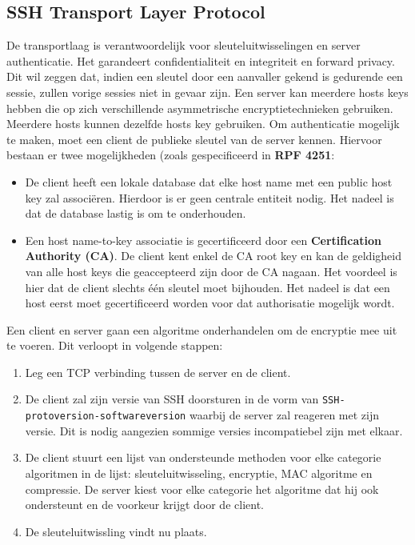 \documentclass{report}
\begin{document}
	\subsection{SSH Transport Layer Protocol}
	De transportlaag is verantwoordelijk voor sleuteluitwisselingen en server authenticatie. Het garandeert confidentialiteit en integriteit en forward privacy. Dit wil zeggen dat, indien een sleutel door een aanvaller gekend is gedurende een sessie, zullen vorige sessies niet in gevaar zijn. Een server kan meerdere hosts keys hebben die op zich verschillende asymmetrische encryptietechnieken gebruiken. Meerdere hosts kunnen dezelfde hosts key gebruiken. Om authenticatie mogelijk te maken, moet een client de publieke sleutel van de server kennen. Hiervoor bestaan er twee mogelijkheden (zoals gespecificeerd in \textbf{RPF 4251}:
	\begin{itemize}
		\item De client heeft een lokale database dat elke host name met een public host key zal associëren. Hierdoor is er geen centrale entiteit nodig. Het nadeel is dat de database lastig is om te onderhouden.
		\item Een host name-to-key associatie is gecertificeerd door een \textbf{Certification Authority (CA)}. De client kent enkel de CA root key en kan de geldigheid van alle host keys die geaccepteerd zijn door de CA nagaan. Het voordeel is hier dat de client slechts één sleutel moet bijhouden. Het nadeel is dat een host eerst moet gecertificeerd worden voor dat authorisatie mogelijk wordt.
	\end{itemize}
	Een client en server gaan een algoritme onderhandelen om de encryptie mee uit te voeren. Dit verloopt in volgende stappen:
	\begin{enumerate}
		\item Leg een TCP verbinding tussen de server en de client.
		\item De client zal zijn versie van SSH doorsturen in de vorm van \texttt{SSH-protoversion-softwareversion} waarbij de server zal reageren met zijn versie. Dit is nodig aangezien sommige versies incompatiebel zijn met elkaar.
		\item De client stuurt een lijst van ondersteunde methoden voor elke categorie algoritmen in de lijst: sleuteluitwisseling, encryptie, MAC algoritme en compressie.
		De server kiest voor elke categorie het algoritme dat hij ook ondersteunt en de voorkeur krijgt door de client.
		\item De sleuteluitwissling vindt nu plaats. 
	\end{enumerate}
\end{document}
